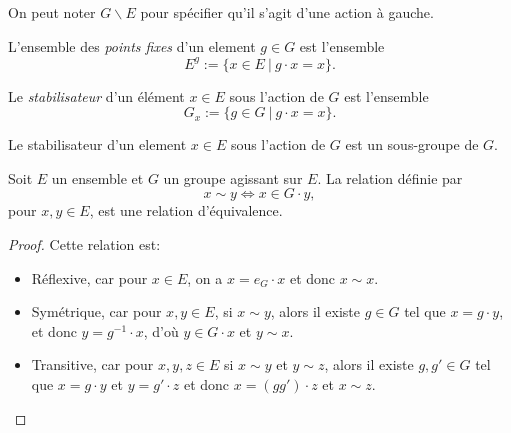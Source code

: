\begin{notation}
	On peut noter $G \backslash E$ pour spécifier qu'il s'agit d'une action à gauche.
\end{notation}

\begin{definition}
	L'ensemble des \emph{points fixes} d'un element $g \in G$ est l'ensemble
	\begin{equation*}
		E^g := \{x \in E\ |\ g \cdot x = x\}.
	\end{equation*}
\end{definition}

\begin{definition}
	Le \emph{stabilisateur} d'un élément $x \in E$ sous l'action de $G$ est l'ensemble
	\begin{equation*}
		G_x := \{g \in G\ |\ g \cdot x = x\}.
	\end{equation*}
\end{definition}

\begin{remark}
	Le stabilisateur d'un element $x \in E$ sous l'action de $G$
	est un sous-groupe de $G$.	
\end{remark}

\begin{theorem}
	Soit $E$ un ensemble et $G$ un groupe agissant sur $E$. La relation définie par
	\begin{equation*}
		x \sim y \iff x \in G \cdot y,
	\end{equation*}
	pour $x, y \in E$, est une relation d'équivalence.
\end{theorem}

\begin{proof}
	Cette relation est:
	\begin{itemize}
		\item Réflexive, car pour $x \in E$, on a $x = e_G \cdot x$ et donc $x \sim x$.
		\item Symétrique, car pour $x, y \in E$, si $x \sim y$,
			alors il existe $g \in G$ tel que $x = g \cdot y$, et donc $y = g^{-1} \cdot x$,
			d'où $y \in G \cdot x$ et $y \sim x$.
		\item Transitive, car pour $x, y, z \in E$ si $x \sim y$ et $y \sim z$,
			alors il existe $g,g' \in G$ tel que $x = g \cdot y$ et
			$y = g' \cdot z$ et donc $x = (g g') \cdot z$ et $x \sim z$.
	\end{itemize}
\end{proof}

